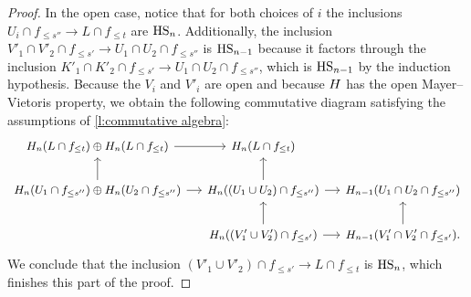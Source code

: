 \begin{proof}
	In the open case, notice that for both choices of $i$ the inclusions
	$U_i \cap f_{\leq s''} \to L \cap f_{\leq t}$
	are $\mathrm{HS}_n$.
	Additionally, the inclusion
	$V'_1 \cap V'_2 \cap f_{\leq s'} \to U_1 \cap U_2 \cap f_{\leq s''}$
	is $\mathrm{HS}_{n-1}$ because it factors through the inclusion
	$K'_1 \cap K'_2 \cap f_{\leq s'} \to U_1 \cap U_2 \cap f_{\leq s''}$,
	which is $\mathrm{HS}_{n-1}$ by the induction hypothesis.
	Because the $V_i$ and $V'_i$ are open and because $H$ has the open Mayer--Vietoris property, we obtain the following commutative diagram satisfying the assumptions of \cref{l:commutative algebra}:
	\[
	\begin{tikzcd}[column sep=small,every matrix/.append style={nodes={font=\small}}]
	\H_n(L \cap f_{\leq t}) \oplus \H_n(L \cap f_{\leq t}) \arrow[r] &
	\H_n(L \cap f_{\leq t}) & \\
	\H_{n}(U_1 \cap f_{\leq s''}) \oplus \H_n(U_2 \cap f_{\leq s''}) \arrow[r] \arrow[u] &
	\H_{n}((U_1 \cup U_2) \cap f_{\leq s''}) \arrow[r] \arrow[u] &
	\H_{n-1}(U_1 \cap U_2 \cap f_{\leq s''}) \\ &
	\H_{n}((V'_1 \cup V'_2) \cap f_{\leq s'}) \arrow[r] \arrow[u] &
	\H_{n-1}(V'_1 \cap V'_2 \cap f_{\leq s'}) \arrow[u].
	\end{tikzcd}
	\]
	We conclude that the inclusion
	$\left(V'_1 \cup V'_2 \right) \cap f_{\leq s'} \to L \cap f_{\leq t}$
	is $\mathrm{HS}_n$, which finishes this part of the proof.


\end{proof}
